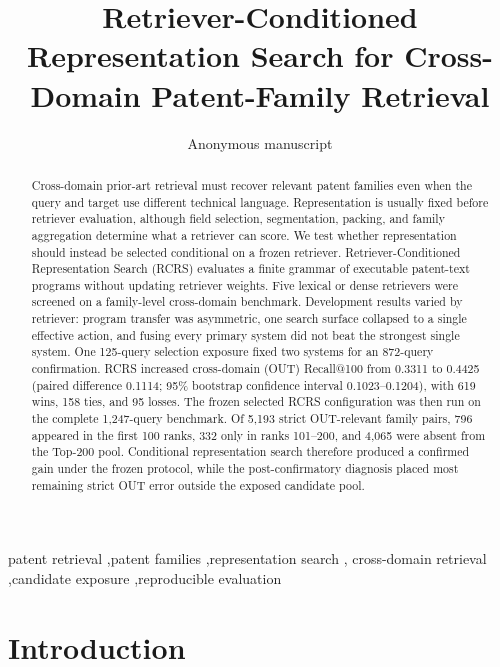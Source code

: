 \documentclass[final,5p,times,twocolumn]{elsarticle}
\newcommand{\RCRS}{RCRS}
\begin{document}
\begin{frontmatter}

\title{Retriever-Conditioned Representation Search for Cross-Domain Patent-Family Retrieval}

\author{Anonymous manuscript}

\begin{abstract}
Cross-domain prior-art retrieval must recover relevant patent families even
when the query and target use different technical language. Representation is
usually fixed before retriever evaluation, although field selection,
segmentation, packing, and family aggregation determine what a retriever can
score. We test whether representation should instead be selected conditional
on a frozen retriever. Retriever-Conditioned Representation Search (\RCRS{})
evaluates a finite grammar of executable patent-text programs without updating
retriever weights. Five lexical or dense retrievers were screened on a
family-level cross-domain benchmark. Development results varied by retriever:
program transfer was asymmetric, one search surface collapsed to a single
effective action, and fusing every primary system did not beat the strongest
single system. One 125-query selection exposure fixed two systems for an
872-query confirmation. \RCRS{} increased cross-domain (OUT) Recall@100 from 0.3311 to
0.4425 (paired difference 0.1114; 95\% bootstrap confidence interval
0.1023--0.1204), with 619 wins, 158 ties, and 95 losses. The frozen selected RCRS configuration was
then run on the complete 1,247-query benchmark. Of 5,193 strict OUT-relevant
family pairs, 796 appeared in the first 100 ranks, 332 only in ranks 101--200,
and 4,065 were absent from the Top-200 pool. Conditional representation search
therefore produced a confirmed gain under the frozen protocol, while the
post-confirmatory diagnosis placed most remaining strict OUT error outside the
exposed candidate pool.
\end{abstract}

\begin{keyword}
patent retrieval \sep patent families \sep representation search \sep
cross-domain retrieval \sep candidate exposure \sep reproducible evaluation
\end{keyword}

\end{frontmatter}

\section{Introduction}
\end{document}

